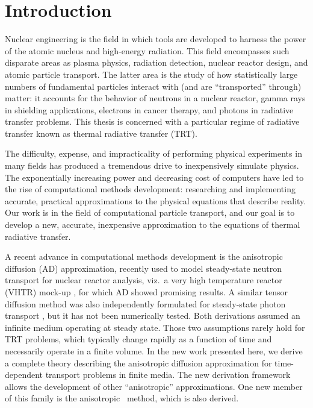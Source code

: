 
\chapter{Introduction}\label{chap:introduction}

Nuclear engineering is the field in which tools are developed to harness the
power of the
atomic nucleus and high-energy radiation. This field encompasses such
disparate areas as plasma physics, radiation detection, nuclear reactor design,
and atomic particle transport. The latter area is the study of how
statistically large numbers of fundamental particles interact with (and are
``transported'' through) matter: it
accounts for the behavior of neutrons in a nuclear reactor,
gamma rays in shielding applications, electrons in cancer therapy, and photons
in radiative transfer problems. This thesis is concerned with a
particular regime of radiative transfer known as thermal radiative transfer
(TRT).

The difficulty, expense, and impracticality of performing physical
experiments in many fields has produced a tremendous drive to inexpensively
simulate physics. The exponentially increasing power and decreasing cost of
computers have led to the rise of computational methods development:
researching and implementing accurate, practical approximations to the physical
equations that describe reality. Our work is in the field of computational
particle transport, and our goal is to develop a new, accurate, inexpensive
approximation to the equations of thermal radiative transfer.

A recent advance in computational methods development is the anisotropic
diffusion (AD)
approximation, recently used to model steady-state neutron transport for
nuclear reactor analysis, viz.~a very high temperature reactor
(VHTR) mock-up \cite{Lar2009c,Tra2011}, for which AD showed promising
results. A similar tensor diffusion
method was also independently formulated for steady-state photon transport
\cite{Mor2007}, but it has not been numerically tested.
Both derivations assumed an infinite medium operating at steady state.
Those two assumptions rarely hold for TRT problems, which typically change
rapidly as a
function of time and necessarily operate in a finite volume. In the new
work presented here, we derive a complete theory describing the anisotropic
diffusion approximation for time-dependent transport problems in finite media.
The new derivation framework allows the development of other ``anisotropic''
approximations. One new member of this family is the anisotropic
\Pone\ method, which is also derived.

